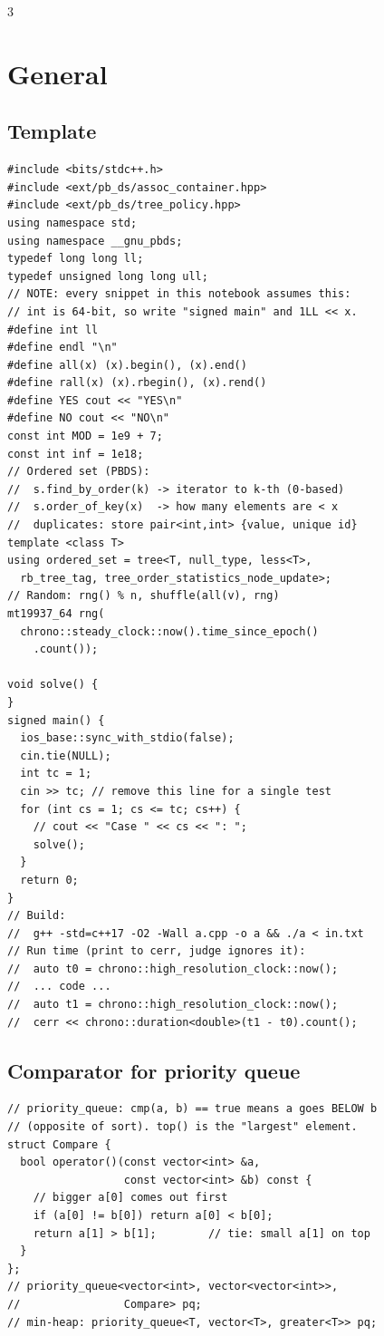 \documentclass[8pt, a4paper]{article}
\begin{document}
\begin{multicols*}{3}
\section{General}
\subsection{Template}
\begin{lstlisting}
#include <bits/stdc++.h>
#include <ext/pb_ds/assoc_container.hpp>
#include <ext/pb_ds/tree_policy.hpp>
using namespace std;
using namespace __gnu_pbds;
typedef long long ll;
typedef unsigned long long ull;
// NOTE: every snippet in this notebook assumes this:
// int is 64-bit, so write "signed main" and 1LL << x.
#define int ll
#define endl "\n"
#define all(x) (x).begin(), (x).end()
#define rall(x) (x).rbegin(), (x).rend()
#define YES cout << "YES\n"
#define NO cout << "NO\n"
const int MOD = 1e9 + 7;
const int inf = 1e18;
// Ordered set (PBDS):
//  s.find_by_order(k) -> iterator to k-th (0-based)
//  s.order_of_key(x)  -> how many elements are < x
//  duplicates: store pair<int,int> {value, unique id}
template <class T>
using ordered_set = tree<T, null_type, less<T>,
  rb_tree_tag, tree_order_statistics_node_update>;
// Random: rng() % n, shuffle(all(v), rng)
mt19937_64 rng(
  chrono::steady_clock::now().time_since_epoch()
    .count());

void solve() {
}
signed main() {
  ios_base::sync_with_stdio(false);
  cin.tie(NULL);
  int tc = 1;
  cin >> tc; // remove this line for a single test
  for (int cs = 1; cs <= tc; cs++) {
    // cout << "Case " << cs << ": ";
    solve();
  }
  return 0;
}
// Build:
//  g++ -std=c++17 -O2 -Wall a.cpp -o a && ./a < in.txt
// Run time (print to cerr, judge ignores it):
//  auto t0 = chrono::high_resolution_clock::now();
//  ... code ...
//  auto t1 = chrono::high_resolution_clock::now();
//  cerr << chrono::duration<double>(t1 - t0).count();
\end{lstlisting}
\subsection{Comparator for priority queue}
\begin{lstlisting}
// priority_queue: cmp(a, b) == true means a goes BELOW b
// (opposite of sort). top() is the "largest" element.
struct Compare {
  bool operator()(const vector<int> &a,
                  const vector<int> &b) const {
    // bigger a[0] comes out first
    if (a[0] != b[0]) return a[0] < b[0];
    return a[1] > b[1];        // tie: small a[1] on top
  }
};
// priority_queue<vector<int>, vector<vector<int>>,
//                Compare> pq;
// min-heap: priority_queue<T, vector<T>, greater<T>> pq;
\end{lstlisting}

\end{multicols*}
\end{document}
